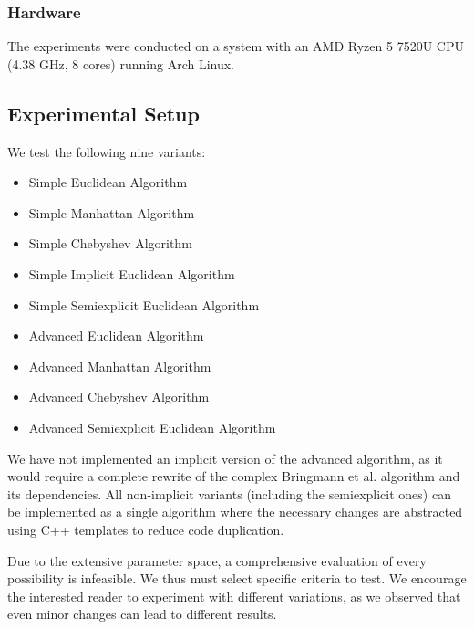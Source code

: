 \subsubsection{Hardware}
\label{subsubsec:hardware}
The experiments were conducted on a system with an AMD Ryzen 5 7520U CPU (4.38 GHz, 8 cores) running Arch Linux.

\subsection{Experimental Setup}
\label{subsec:exp_setup}

We test the following nine variants:
\begin{itemize}
	\item Simple Euclidean Algorithm
	\item Simple Manhattan Algorithm
	\item Simple Chebyshev Algorithm
	\item Simple Implicit Euclidean Algorithm
	\item Simple Semiexplicit Euclidean Algorithm
	\item Advanced Euclidean Algorithm
	\item Advanced Manhattan Algorithm
	\item Advanced Chebyshev Algorithm
	\item Advanced Semiexplicit Euclidean Algorithm
\end{itemize}

We have not implemented an implicit version of the advanced algorithm, as it would require a complete rewrite of the complex Bringmann et al. algorithm and its dependencies. All non-implicit variants (including the semiexplicit ones) can be implemented as a single algorithm where the necessary changes are abstracted using C++ templates to reduce code duplication.

Due to the extensive parameter space, a comprehensive evaluation of every possibility is infeasible. We thus must select specific criteria to test. We encourage the interested reader to experiment with different variations, as we observed that even minor changes can lead to different results.

